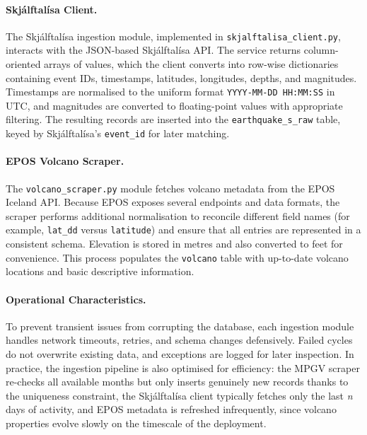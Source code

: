 \documentclass[12pt]{article}
\begin{document}
\paragraph{Skjálftalísa Client.}

The Skjálftalísa ingestion module, implemented in \texttt{skjalftalisa\_client.py}, interacts with the JSON-based Skjálftalísa API. The service returns column-oriented arrays of values, which the client converts into row-wise dictionaries containing event IDs, timestamps, latitudes, longitudes, depths, and magnitudes. Timestamps are normalised to the uniform format \texttt{YYYY-MM-DD HH:MM:SS} in UTC, and magnitudes are converted to floating-point values with appropriate filtering. The resulting records are inserted into the \texttt{earthquake\_s\_raw} table, keyed by Skjálftalísa’s \texttt{event\_id} for later matching.

\paragraph{EPOS Volcano Scraper.}

The \texttt{volcano\_scraper.py} module fetches volcano metadata from the EPOS Iceland API. Because EPOS exposes several endpoints and data formats, the scraper performs additional normalisation to reconcile different field names (for example, \texttt{lat\_dd} versus \texttt{latitude}) and ensure that all entries are represented in a consistent schema. Elevation is stored in metres and also converted to feet for convenience. This process populates the \texttt{volcano} table with up-to-date volcano locations and basic descriptive information.

\paragraph{Operational Characteristics.}

To prevent transient issues from corrupting the database, each ingestion module handles network timeouts, retries, and schema changes defensively. Failed cycles do not overwrite existing data, and exceptions are logged for later inspection. In practice, the ingestion pipeline is also optimised for efficiency: the MPGV scraper re-checks all available months but only inserts genuinely new records thanks to the uniqueness constraint, the Skjálftalísa client typically fetches only the last \emph{n} days of activity, and EPOS metadata is refreshed infrequently, since volcano properties evolve slowly on the timescale of the deployment.
\end{document}

